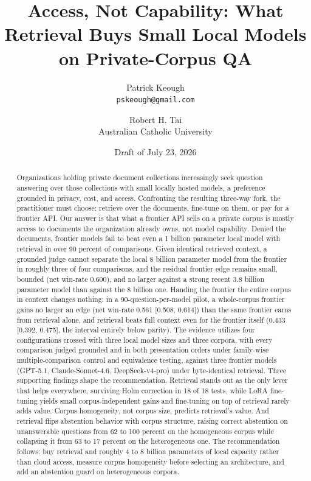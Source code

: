 \documentclass[11pt]{article}
\title{Access, Not Capability: What Retrieval Buys Small Local Models on Private-Corpus QA}
\author{Patrick Keough\\
\texttt{pskeough@gmail.com}
\and
Robert H. Tai\\
Australian Catholic University}
\date{Draft of July 23, 2026}
\begin{document}
\maketitle

\begin{abstract}
Organizations holding private document collections increasingly seek question answering over those collections with small locally hosted models, a preference grounded in privacy, cost, and access. Confronting the resulting three-way fork, the practitioner must choose: retrieve over the documents, fine-tune on them, or pay for a frontier API. Our answer is that what a frontier API sells on a private corpus is mostly access to documents the organization already owns, not model capability. Denied the documents, frontier models fail to beat even a 1 billion parameter local model with retrieval in over 90 percent of comparisons. Given identical retrieved context, a grounded judge cannot separate the local 8 billion parameter model from the frontier in roughly three of four comparisons, and the residual frontier edge remains small, bounded (net win-rate 0.600), and no larger against a strong recent 3.8 billion parameter model than against the 8 billion one. Handing the frontier the entire corpus in context changes nothing: in a 90-question-per-model pilot, a whole-corpus frontier gains no larger an edge (net win-rate 0.561 [0.508, 0.614]) than the same frontier earns from retrieval alone, and retrieval beats full context even for the frontier itself (0.433 [0.392, 0.475], the interval entirely below parity). The evidence utilizes four configurations crossed with three local model sizes and three corpora, with every comparison judged grounded and in both presentation orders under family-wise multiple-comparison control and equivalence testing, against three frontier models (GPT-5.1, Claude-Sonnet-4.6, DeepSeek-v4-pro) under byte-identical retrieval. Three supporting findings shape the recommendation. Retrieval stands out as the only lever that helps everywhere, surviving Holm correction in 18 of 18 tests, while LoRA fine-tuning yields small corpus-independent gains and fine-tuning on top of retrieval rarely adds value. Corpus homogeneity, not corpus size, predicts retrieval's value. And retrieval flips abstention behavior with corpus structure, raising correct abstention on unanswerable questions from 62 to 100 percent on the homogeneous corpus while collapsing it from 63 to 17 percent on the heterogeneous one. The recommendation follows: buy retrieval and roughly 4 to 8 billion parameters of local capacity rather than cloud access, measure corpus homogeneity before selecting an architecture, and add an abstention guard on heterogeneous corpora.
\end{abstract}
\end{document}
